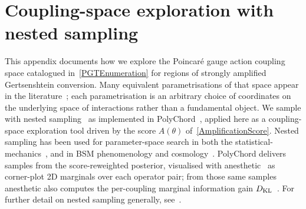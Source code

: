
\section{Coupling-space exploration with nested sampling}%
\label{InferenceArchitecture}

This appendix documents how we explore the Poincar\'{e} gauge
action coupling space catalogued in~\cref{PGTEnumeration} for
regions of strongly amplified Gertsenshtein conversion. Many
equivalent parametrisations of that space appear in the
literature~\cite{barker2024poincare,lin2019pgt,karananas2014parity,blagojevic2018hamiltonian,bahamonde2025cubic};
each parametrisation is an arbitrary choice of coordinates on the underlying space of
interactions rather than a fundamental object. We sample with nested
sampling~\cite{Skilling:2006gxv,Feroz:2008xx,Brewer:2010,Brewer:2016scw,Speagle:2019ivv}
as implemented in PolyChord~\cite{Handley:2015fda,Handley:2015vkr},
applied here as a coupling-space exploration tool driven by the
score $A(\theta)$ of~\cref{AmplificationScore}. Nested sampling
has been used for parameter-space search in both the
statistical-mechanics~\cite{Partay:2021materials,Martiniani:2014sens,Burkoff:2012protein,Ashton:2022grj},
and in BSM phenomenology and cosmology~\cite{GAMBIT:2017zdo,Giani:2023gfq,Ashton:2022grj}.
PolyChord delivers samples from the score-reweighted posterior, visualised with
anesthetic~\cite{Handley:2019mfs} as corner-plot 2D marginals over
each operator pair; from those same samples anesthetic \cite{Handley:2019mfs} also
computes the per-coupling marginal information gain
$D_\mathrm{KL}$~\cite{Kullback:1951zyt}. For further detail on nested sampling
generally, see~\cite{MacKay:2003,Hobson:2010,Trotta:2017wnx,Sivia:2006}.

